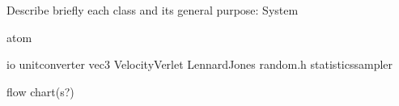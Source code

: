 

Describe briefly each class and its general purpose:
System

atom


io
unitconverter
vec3
VelocityVerlet
LennardJones
random.h
statisticssampler


flow chart(s?)